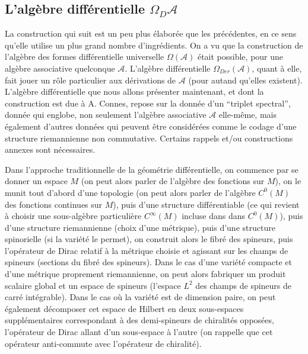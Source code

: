 \subsection{L'alg\`ebre diff\'erentielle $\Omega_{D}{\mathcal A}$}
La construction qui suit est un peu plus \'elabor\'ee que les pr\'ec\'edentes, 
en ce sens qu'elle utilise un plus grand nombre d'ingr\'edients. On 
a vu que la construction de l'alg\`ebre des formes diff\'erentielle universelle
$\Omega({\mathcal A})$ \'etait 
possible, pour une alg\`ebre associative quelconque ${\mathcal A}$. L'alg\`ebre 
diff\'erentielle $\Omega_{Der}({\mathcal A})$, quant \`a elle, fait jouer un r\^ole 
particulier aux d\'erivations de ${\mathcal A}$ (pour autand qu'elles 
existent). L'alg\`ebre diff\'erentielle que nous allons pr\'esenter 
maintenant, et dont la construction est due \`a A. Connes, repose sur la 
donn\'ee d'un ``triplet spectral'', donn\'ee qui englobe, non seulement 
l'alg\`ebre associative ${\mathcal A}$ elle-m\^eme, mais \'egalement 
d'autres donn\'ees qui peuvent \^etre consid\'er\'ees comme le codage d'une 
structure riemannienne non commutative. Certains rappels et/ou 
constructions annexes sont n\'ecessaires.

Dans l'approche traditionnelle de la g\'eom\'etrie diff\'erentielle, on commence 
par se donner un espace $M$ (on peut alors parler de l'alg\`ebre des 
fonctions sur $M$), on le munit tout d'abord d'une 
topologie (on peut alors parler de l'alg\`ebre $C^{0}(M)$ des fonctions continues 
sur $M$), puis d'une structure diff\'erentiable (ce qui revient \`a 
choisir une sous-alg\`ebre particuli\`ere  $C^{\infty}(M)$  incluse dans 
dans $C^{0}(M)$),
puis d'une structure riemannienne (choix d'une m\'etrique), puis d'une 
structure spinorielle (si la vari\'et\'e le permet), on construit alors
le fibr\'e des spineurs, puis l'op\'erateur de Dirac relatif \`a la m\'etrique 
choisie et agissant sur les champs de spineurs (sections du fibr\'e 
des spineurs). Dans le cas d'une vari\'et\'e compacte et d'une m\'etrique 
proprement riemannienne, on peut alors fabriquer un produit scalaire 
global et un espace de spineurs (l'espace $L^{2}$ des champs de 
spineurs de carr\'e int\'egrable). Dans le cas o\`u la vari\'et\'e est de 
dimension paire, on peut \'egalement d\'ecomposer cet espace de Hilbert en 
deux sous-espaces suppl\'ementaires correspondant \`a des demi-spineurs de 
chiralit\'es oppos\'ees, l'op\'erateur de Dirac allant d'un sous-espace \`a 
l'autre (on rappelle que cet op\'erateur anti-commute avec l'op\'erateur 
de chiralit\'e).

